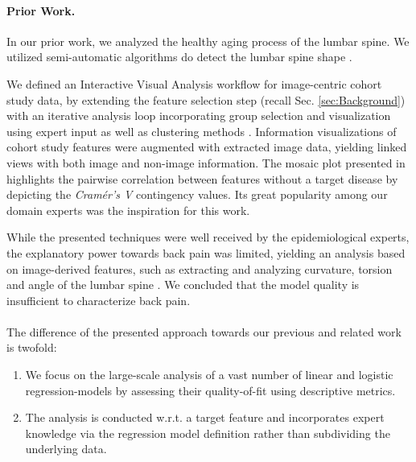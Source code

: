 \documentclass[journal]{style/vgtc} 			          %
\begin{document}
\paragraph{Prior Work.}
In our prior work, we analyzed the healthy aging process of the lumbar spine.
We utilized semi-automatic algorithms do detect the lumbar spine shape \cite{Klemm2013VMV, Rak2013}.

We defined an Interactive Visual Analysis workflow for image-centric cohort study data, by extending the feature selection step (recall Sec. \ref{sec:Background}) with an iterative analysis loop incorporating group selection and visualization using expert input as well as clustering methods \cite{Klemm2014VIS}.
Information visualizations of cohort study features were augmented with extracted image data, yielding linked views with both image and non-image information.
The mosaic plot presented in \cite{Klemm2014VIS} highlights the pairwise correlation between features without a target disease by depicting the \emph{Cram\'{e}r's V} contingency values.
Its great popularity among our domain experts was the inspiration for this work.

While the presented techniques were well received by the epidemiological experts, the explanatory power towards back pain was limited, yielding an analysis based on image-derived features, such as extracting and analyzing curvature, torsion and angle of the lumbar spine \cite{Klemm2015}.
We concluded that the model quality is insufficient to characterize back pain.
\\\\
The difference of the presented approach towards our previous and related work is twofold:
\begin{enumerate}
	\item We focus on the large-scale analysis of a vast number of linear and logistic regression-models by assessing their quality-of-fit using descriptive metrics.
	\item The analysis is conducted w.r.t. a target feature and incorporates expert knowledge via the regression model definition rather than subdividing the underlying data.
\end{enumerate}
\end{document}
